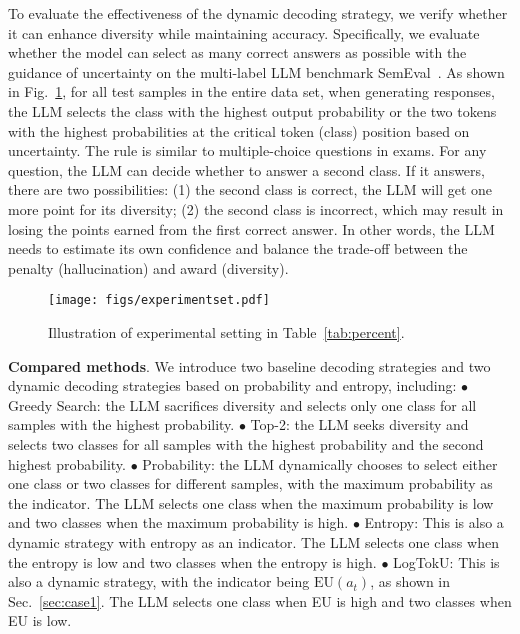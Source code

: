 

To evaluate the effectiveness of the dynamic decoding strategy, we verify whether it can enhance diversity while maintaining accuracy. Specifically, we evaluate whether the model can select as many correct answers as possible with the guidance of uncertainty on the multi-label LLM benchmark SemEval~\cite{mohammad-etal-2018-semeval}. As shown in Fig.~\ref{fig:seting}, for all test samples in the entire data set, when generating responses, the LLM selects the class with the highest output probability or the two tokens with the highest probabilities at the critical token (class) position based on uncertainty. The rule is similar to multiple-choice questions in exams. For any question, the LLM can decide whether to answer a second class. If it answers, there are two possibilities: (1) the second class is correct, the LLM will get one more point for its diversity; (2) the second class is incorrect, which may result in losing the points earned from the first correct answer. In other words, the LLM needs to estimate its own confidence and balance the trade-off between the penalty (hallucination) and award (diversity).


\begin{figure}
\centering 
\texttt{[image: figs/experimentset.pdf]} 
\caption{Illustration of experimental setting in Table~\ref{tab:percent}.} \label{fig:seting}
\end{figure}



\textbf{Compared methods}. We introduce two baseline decoding strategies and two dynamic decoding strategies based on probability and entropy, including: $\bullet$ Greedy Search: the LLM sacrifices diversity and selects only one class for all samples with the highest probability. $\bullet$ Top-2: the LLM seeks diversity and selects two classes for all samples with the highest probability and the second highest probability. $\bullet$ Probability: the LLM dynamically chooses to select either one class or two classes for different samples, with the maximum probability as the indicator. The LLM selects one class when the maximum probability is low and two classes when the maximum probability is high. $\bullet$ Entropy: This is also a dynamic strategy with entropy as an indicator. The LLM selects one class when the entropy is low and two classes when the entropy is high. $\bullet$ LogTokU: This is also a dynamic strategy, with the indicator being $\text{EU}(a_t)$, as shown in Sec.~\ref{sec:case1}. The LLM selects one class when EU is high and two classes when EU is low.



